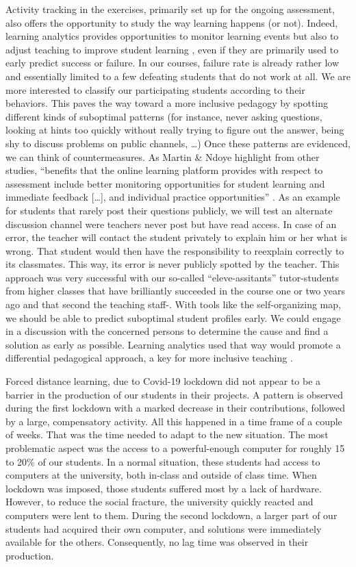 \documentclass{aims}
\theoremstyle{definition}
\begin{document}
Activity tracking in the exercises, primarily set up for the ongoing
assessment, also offers the opportunity to study the way learning
happens (or not). Indeed, learning analytics provides opportunities to
monitor learning events but also to adjust teaching to improve student
learning \cite{Martin2016, Romero2020}, even if they are primarily used
to early predict success or failure. In our courses, failure rate is
already rather low and essentially limited to a few defeating students
that do not work at all. We are more interested to classify our
participating students according to their behaviors. This paves the way
toward a more inclusive pedagogy by spotting different kinds of
suboptimal patterns (for instance, never asking questions, looking at
hints too quickly without really trying to figure out the answer, being
shy to discuss problems on public channels, \ldots) Once these patterns
are evidenced, we can think of countermeasures. As Martin \& Ndoye
highlight from other studies, ``benefits that the online learning
platform provides with respect to assessment include better monitoring
opportunities for student learning and immediate feedback {[}\ldots{]},
and individual practice opportunities'' \cite{Martin2016}. As an example
for students that rarely post their questions publicly, we will test an
alternate discussion channel were teachers never post but have read
access. In case of an error, the teacher will contact the student
privately to explain him or her what is wrong. That student would then
have the responsibility to reexplain correctly to its classmates. This
way, its error is never publicly spotted by the teacher. This approach
was very successful with our so-called ``eleve-assitants''
tutor-students from higher classes that have brilliantly succeeded in
the course one or two years ago and that second the teaching staff-.
With tools like the self-organizing map, we should be able to predict
suboptimal student profiles early. We could engage in a discussion with
the concerned persons to determine the cause and find a solution as
early as possible. Learning analytics used that way would promote a
differential pedagogical approach, a key for more inclusive teaching
\cite{Siemens2013}.

Forced distance learning, due to Covid-19 lockdown did not appear to be
a barrier in the production of our students in their projects. A pattern
is observed during the first lockdown with a marked decrease in their
contributions, followed by a large, compensatory activity. All this
happened in a time frame of a couple of weeks. That was the time needed
to adapt to the new situation. The most problematic aspect was the
access to a powerful-enough computer for roughly 15 to 20\% of our
students. In a normal situation, these students had access to computers
at the university, both in-class and outside of class time. When
lockdown was imposed, those students suffered most by a lack of
hardware. However, to reduce the social fracture, the university quickly
reacted and computers were lent to them. During the second lockdown, a
larger part of our students had acquired their own computer, and
solutions were immediately available for the others. Consequently, no
lag time was observed in their production.
\end{document}
